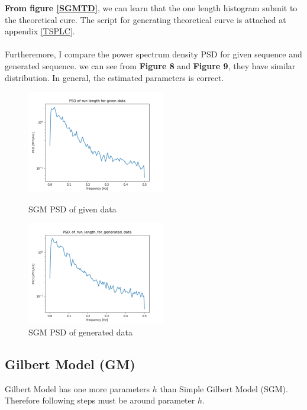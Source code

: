 \documentclass[11pt]{article}
\begin{document}
\textbf{From figure \ref{SGMTD}}, we can learn that the one length histogram submit to the theoretical cure.
The script for generating theoretical curve is attached at appendix \ref{TSPLC}.
\paragraph{}
Furtheremore, I compare the power spectrum density PSD for given sequence and generated sequence.
we can see from \textbf{Figure 8} and \textbf{Figure 9}, they have similar distribution.
In general, the estimated parameters is correct.
\begin{figure}[htbp]
    \centering
    \begin{minipage}[t]{0.48\textwidth}
    \centering
    \includegraphics[width=6cm]{PSD_of_run_length_for_given_data.png}
    \caption{SGM PSD of given data}
    \end{minipage}
    \begin{minipage}[t]{0.48\textwidth}
    \centering
    \includegraphics[width=6cm]{PSD_of_run_length_for_generated_data.png}
    \caption{SGM PSD of generated data}
    \end{minipage}
\end{figure}
\clearpage
\subsection{Gilbert Model (GM)}
Gilbert Model has one more parameters $h$ than Simple Gilbert Model (SGM). Therefore following steps must be around parameter $h$.
\end{document}
